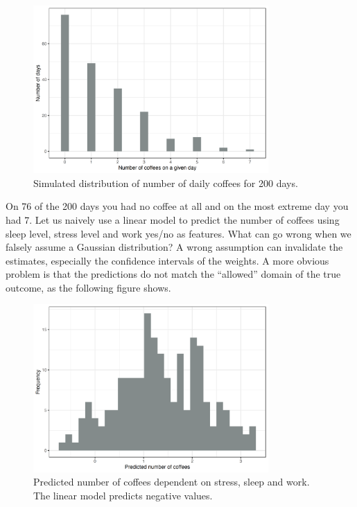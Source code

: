 \documentclass[
  11pt,
]{scrbook}
\begin{document}
\begin{figure}

{\centering \includegraphics[width=0.8\textwidth]{images/poisson-data-1} 

}

\caption{Simulated distribution of number of daily coffees for 200 days.}\label{fig:poisson-data}
\end{figure}

On 76 of the 200 days you had no coffee at all and on the most extreme day you had 7.
Let us naively use a linear model to predict the number of coffees using sleep level, stress level and work yes/no as features.
What can go wrong when we falsely assume a Gaussian distribution?
A wrong assumption can invalidate the estimates, especially the confidence intervals of the weights.
A more obvious problem is that the predictions do not match the ``allowed'' domain of the true outcome, as the following figure shows.

\begin{figure}

{\centering \includegraphics[width=0.8\textwidth]{images/failing-linear-model-1} 

}

\caption{Predicted number of coffees dependent on stress, sleep and work. The linear model predicts negative values.}\label{fig:failing-linear-model}
\end{figure}
\end{document}
